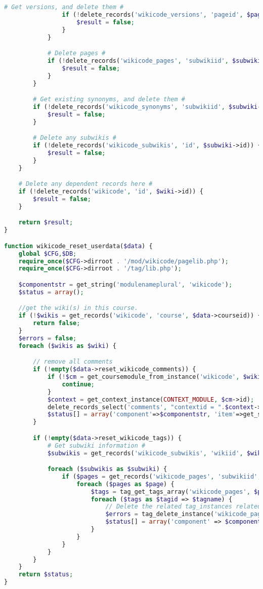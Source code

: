\begin{lstlisting}[language=PHP]
                # Get versions, and delete them #
                if (!delete_records('wikicode_versions', 'pageid', $page->id)) {
                    $result = false;
                }
            }

            # Delete pages #
            if (!delete_records('wikicode_pages', 'subwikiid', $subwiki->id)) {
                $result = false;
            }
        }

        # Get existing synonyms, and delete them #
        if (!delete_records('wikicode_synonyms', 'subwikiid', $subwiki->id)) {
            $result = false;
        }

        # Delete any subwikis #
        if (!delete_records('wikicode_subwikis', 'id', $subwiki->id)) {
            $result = false;
        }
    }

    # Delete any dependent records here #
    if (!delete_records('wikicode', 'id', $wiki->id)) {
        $result = false;
    }

    return $result;
}

function wikicode_reset_userdata($data) {
    global $CFG,$DB;
    require_once($CFG->dirroot . '/mod/wikicode/pagelib.php');
    require_once($CFG->dirroot . '/tag/lib.php');

    $componentstr = get_string('modulenameplural', 'wikicode');
    $status = array();

    //get the wiki(s) in this course.
    if (!$wikis = get_records('wikicode', 'course', $data->courseid)) {
        return false;
    }
    $errors = false;
    foreach ($wikis as $wiki) {

        // remove all comments
        if (!empty($data->reset_wikicode_comments)) {
            if (!$cm = get_coursemodule_from_instance('wikicode', $wiki->id)) {
                continue;
            }
            $context = get_context_instance(CONTEXT_MODULE, $cm->id);
            delete_records_select('comments', "contextid = ".$context->id." AND commentarea='wikicode_page'");
            $status[] = array('component'=>$componentstr, 'item'=>get_string('deleteallcomments'), 'error'=>false);
        }

        if (!empty($data->reset_wikicode_tags)) {
            # Get subwiki information #
            $subwikis = get_records('wikicode_subwikis', 'wikiid', $wiki->id);

            foreach ($subwikis as $subwiki) {
                if ($pages = get_records('wikicode_pages', 'subwikiid', $subwiki->id)) {
                    foreach ($pages as $page) {
                        $tags = tag_get_tags_array('wikicode_pages', $page->id);
                        foreach ($tags as $tagid => $tagname) {
                            // Delete the related tag_instances related to the wiki page.
                            $errors = tag_delete_instance('wikicode_pages', $page->id, $tagid);
                            $status[] = array('component' => $componentstr, 'item' => get_string('tagsdeleted', 'wikicode'), 'error' => $errors);
                        }
                    }
                }
            }
        }
    }
    return $status;
}



\end{lstlisting}
